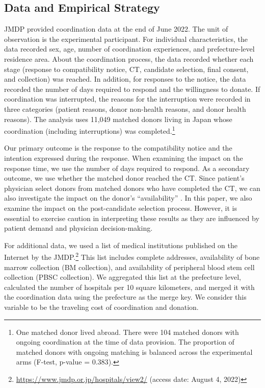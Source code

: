 \documentclass[12pt, a4paper]{article}
\begin{document}
\hypertarget{data-and-empirical-strategy}{%
\subsection{Data and Empirical Strategy}\label{data-and-empirical-strategy}}

JMDP provided coordination data at the end of June 2022. The unit of observation is the experimental participant. For individual characteristics, the data recorded sex, age, number of coordination experiences, and prefecture-level residence area. About the coordination process, the data recorded whether each stage (response to compatibility notice, CT, candidate selection, final consent, and collection) was reached. In addition, for responses to the notice, the data recorded the number of days required to respond and the willingness to donate. If coordination was interrupted, the reasons for the interruption were recorded in three categories (patient reasons, donor non-health reasons, and donor health reasons). The analysis uses 11,049 matched donors living in Japan whose coordination (including interruptions) was completed.\footnote{One matched donor lived abroad. There were 104 matched donors with ongoing coordination at the time of data provision. The proportion of matched donors with ongoing matching is balanced across the experimental arms (F-test, p-value = \(0.383\)).}

Our primary outcome is the response to the compatibility notice and the intention expressed during the response. When examining the impact on the response time, we use the number of days required to respond. As a secondary outcome, we use whether the matched donor reached the CT. Since patient's physician select donors from matched donors who have completed the CT, we can also investigate the impact on the donor's ``availability'' \citep{Haylock2022}. In this paper, we also examine the impact on the post-candidate selection process. However, it is essential to exercise caution in interpreting these results as they are influenced by patient demand and physician decision-making.

For additional data, we used a list of medical institutions published on the Internet by the JMDP.\footnote{\url{https://www.jmdp.or.jp/hospitals/view2/} (access date: August 4, 2022)} This list includes complete addresses, availability of bone marrow collection (BM collection), and availability of peripheral blood stem cell collection (PBSC collection). We aggregated this list at the prefecture level, calculated the number of hospitals per 10 square kilometers, and merged it with the coordination data using the prefecture as the merge key. We consider this variable to be the traveling cost of coordination and donation.
\end{document}
